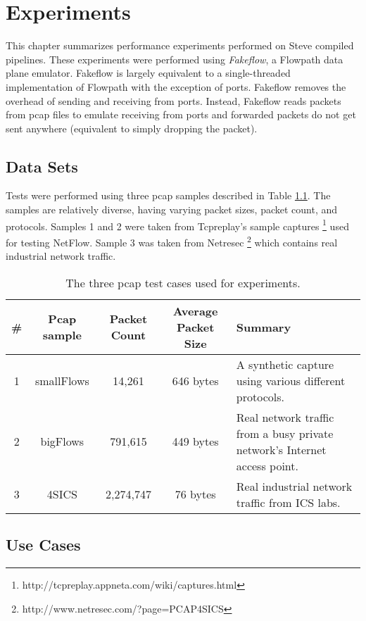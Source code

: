 \chapter{Experiments} \label{ch:experiments}

This chapter summarizes performance experiments performed on Steve compiled pipelines. These experiments were performed using \textit{Fakeflow}, a Flowpath data plane emulator. Fakeflow is largely equivalent to a single-threaded implementation of Flowpath with the exception of ports. Fakeflow removes the overhead of sending and receiving from ports. Instead, Fakeflow reads packets from pcap files to emulate receiving from ports and forwarded packets do not get sent anywhere (equivalent to simply dropping the packet).

\section{Data Sets} \label{exp:use_cases}

Tests were performed using three pcap samples described in Table \ref{tbl:pcap}. 
The samples are relatively diverse, having varying packet sizes, packet count, and protocols. Samples 1 and 2 were taken from Tcpreplay's sample captures \footnote{http://tcpreplay.appneta.com/wiki/captures.html} used for testing NetFlow. Sample 3 was taken from Netresec \footnote{http://www.netresec.com/?page=PCAP4SICS} which contains real industrial network traffic.

\begin{table}
\caption{The three pcap test cases used for experiments.}
\begin{center}
\begin{tabularx}{\textwidth}{| c || c | c | c | X |}
\hline
\# & Pcap sample & Packet Count & Average Packet Size & Summary \\
\hline
1 & smallFlows & 14,261 & 646 bytes & A synthetic capture using various different protocols. \\
\hline
2 & bigFlows & 791,615 & 449 bytes & Real network traffic from a busy private network's Internet access point. \\
\hline
3 & 4SICS & 2,274,747 & 76 bytes & Real industrial network traffic from ICS labs. \\
\hline
\end{tabularx}
\end{center}
\label{tbl:pcap}
\end{table}


\section{Use Cases}

